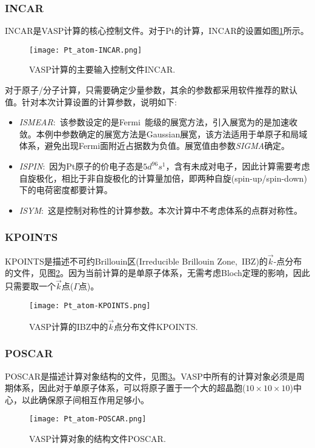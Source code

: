 \subsubsection{\rm{INCAR}}
\textrm{INCAR}是\textrm{VASP}计算的核心控制文件。对于\textrm{Pt}的计算，\textrm{INCAR}的设置如图\ref{Pt_atom:INCAR}所示。
\begin{figure}[h!]
\centering
\texttt{[image: Pt\_atom-INCAR.png]}
\caption{\small \textrm{VASP}计算的主要输入控制文件\textrm{INCAR}.}%
\label{Pt_atom:INCAR}
\end{figure}
对于原子/分子计算，只需要确定少量参数，其余的参数都采用软件推荐的默认值。针对本次计算设置的计算参数，说明如下:~
\begin{itemize}
	\item \textit{ISMEAR}:~该参数设定的是\textrm{Fermi~}能级的展宽方法，引入展宽为的是加速收敛。本例中参数确定的展宽方法是\textrm{Gaussian}展宽，该方法适用于单原子和局域体系，避免出现\textrm{Fermi}面附近占据数为负值。展宽值由参数\textit{SIGMA}确定。
	\item \textit{ISPIN}:~因为\textrm{Pt}原子的价电子态是$5\mathit{d}^96\mathit{s}^1$，含有未成对电子，因此计算需要考虑自旋极化，相比于非自旋极化的计算量加倍，即两种自旋(\textrm{spin-up/spin-down})下的电荷密度都要计算。
	\item \textit{ISYM}:~这是控制对称性的计算参数。本次计算中不考虑体系的点群对称性。
\end{itemize}
\subsubsection{\rm{KPOINTS}}
\textrm{KPOINTS}是描述不可约\textrm{Brillouin}区(\textrm{Irreducible Brillouin Zone,~IBZ})的$\vec k$-点分布的文件，见图\ref{Pt_atom:KPOINTS}。因为当前计算的是单原子体系，无需考虑\textrm{Bloch}定理的影响，因此只需要取一个$\vec k$点($\Gamma$点)。
\begin{figure}[h!]
\centering
\vskip -5pt
\texttt{[image: Pt\_atom-KPOINTS.png]}
\caption{\small \textrm{VASP}计算的\textrm{IBZ}中的$\vec k$点分布文件\textrm{KPOINTS}.}%
\label{Pt_atom:KPOINTS}
\end{figure}
\subsubsection{\rm{POSCAR}}
\textrm{POSCAR}是描述计算对象结构的文件，见图\ref{Pt_atom:POSCAR}。\textrm{VASP}中所有的计算对象必须是周期体系，因此对于单原子体系，可以将原子置于一个大的超晶胞($10\times10\times10$)中心，以此确保原子间相互作用足够小。
\begin{figure}[h!]
\centering
\texttt{[image: Pt\_atom-POSCAR.png]}
\caption{\small \textrm{VASP}计算对象的结构文件\textrm{POSCAR}.}%
\label{Pt_atom:POSCAR}
\end{figure}
